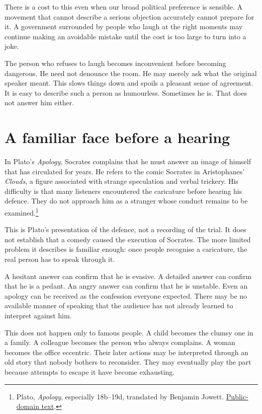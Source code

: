 \documentclass[12pt,a4paper]{book}
\begin{document}
There is a cost to this even when our broad political preference is sensible. A movement that cannot describe a serious objection accurately cannot prepare for it. A government surrounded by people who laugh at the right moments may continue making an avoidable mistake until the cost is too large to turn into a joke.

The person who refuses to laugh becomes inconvenient before becoming dangerous. He need not denounce the room. He may merely ask what the original speaker meant. This slows things down and spoils a pleasant sense of agreement. It is easy to describe such a person as humourless. Sometimes he is. That does not answer him either.

\section*{A familiar face before a hearing}

In Plato's \emph{Apology}, Socrates complains that he must answer an image of himself that has circulated for years. He refers to the comic Socrates in Aristophanes' \emph{Clouds}, a figure associated with strange speculation and verbal trickery. His difficulty is that many listeners encountered the caricature before hearing his defence. They do not approach him as a stranger whose conduct remains to be examined.\footnote{Plato, \emph{Apology}, especially 18b--19d, translated by Benjamin Jowett. \href{https://www.gutenberg.org/files/1656/1656-h/1656-h.htm}{Public-domain text}.}

This is Plato's presentation of the defence, not a recording of the trial. It does not establish that a comedy caused the execution of Socrates. The more limited problem it describes is familiar enough: once people recognise a caricature, the real person has to speak through it.

A hesitant answer can confirm that he is evasive. A detailed answer can confirm that he is a pedant. An angry answer can confirm that he is unstable. Even an apology can be received as the confession everyone expected. There may be no available manner of speaking that the audience has not already learned to interpret against him.

This does not happen only to famous people. A child becomes the clumsy one in a family. A colleague becomes the person who always complains. A woman becomes the office eccentric. Their later actions may be interpreted through an old story that nobody bothers to reconsider. They may eventually play the part because attempts to escape it have become exhausting.
\end{document}
